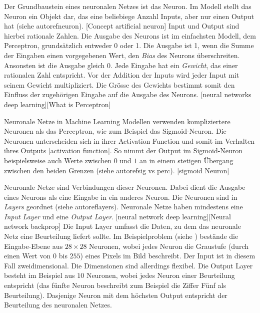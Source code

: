 Der Grundbaustein eines neuronalen Netzes ist das Neuron. Im Modell stellt das
Neuron ein Objekt dar, das eine beliebiege Anzahl Inputs, aber nur einen Output
hat (siehe autoref{neuron}). [Concept artificial neuron] Input und Output sind
hierbei rationale Zahlen. Die Ausgabe des Neurons ist im einfachsten Modell, dem
Perceptron, grundsätzlich entweder 0 oder 1. Die Ausgabe ist 1, wenn die Summe
der Eingaben einen vorgegebenen Wert, den \emph{Bias} des Neurons überschreiten.
Ansonsten ist die Ausgabe gleich 0. Jede Eingabe hat ein \emph{Gewicht}, das
einer rationalen Zahl entspricht. Vor der Addition der Inputs wird jeder Input
mit seinem Gewicht multipliziert.  Die Grösse des Gewichts bestimmt somit den
Einfluss der zugehörigen Eingabe auf die Ausgabe des Neurons. [neural networks
deep learning][What is Perceptron]


Neuronale Netze in Machine Learning Modellen verwenden kompliziertere Neuronen
als das Perceptron, wie zum Beispiel das Sigmoid-Neuron. Die Neuronen
unterscheiden sich in ihrer Activation Function und somit im Verhalten ihres
Outputs [activation function]. So nimmt der Output im Sigmoid-Neuron
beispielsweise auch Werte zwischen $0$ und $1$ an in einem stetigen Übergang
zwischen den beiden Grenzen (siehe autoref{sig vs perc}). [sigmoid Neuron]


Neuronale Netze sind Verbindungen dieser Neuronen. Dabei dient die Ausgabe eines
Neurons als eine Eingabe in ein anderes Neuron. Die Neuronen sind in
\emph{Layers} geordnet (siehe autoref{layers}). Neuronale Netze haben mindestens
eine \emph{Input Layer} und eine \emph{Output Layer}. [neural network deep
learning][Neural network backprop] Die Input Layer umfasst die Daten, zu dem das
neuronale Netz eine Beurteilung liefert sollte. Im Beispielproblem (siehe
) bestände die Eingabe-Ebene aus $28\times28$ Neuronen, wobei
jedes Neuron die Graustufe (durch einen Wert von $0$ bis $255$) eines Pixels im
Bild beschreibt. Der Input ist in diesem Fall zweidimensional. Die Dimensionen
sind allerdings flexibel. Die Output Layer besteht im Beispiel aus $10$
Neuronen, wobei jedes Neuron einer Beurteilung entspricht (das fünfte Neuron
beschreibt zum Beispiel die Ziffer Fünf als Beurteilung). Dasjenige Neuron mit
dem höchsten Output entspricht der Beurteilung des neuronalen Netzes.


